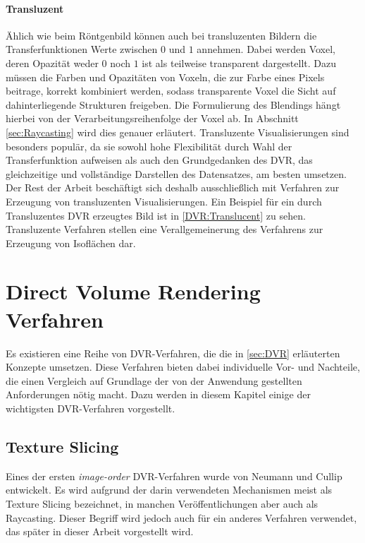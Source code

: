 \documentclass[a4paper,fontsize=12pt,toc=bib,parskip=half,ngerman]{scrartcl}
\begin{document}
\paragraph{Transluzent}
\"Ahlich wie beim R\"ontgenbild k\"onnen auch bei transluzenten Bildern die Transferfunktionen Werte zwischen $0$ und $1$ annehmen. Dabei werden Voxel, deren Opazit\"at weder $0$ noch $1$ ist als teilweise transparent dargestellt. Dazu m\"ussen die Farben und Opazit\"aten von Voxeln, die zur Farbe eines Pixels beitrage, korrekt kombiniert werden, sodass transparente Voxel die Sicht auf dahinterliegende Strukturen freigeben. Die Formulierung des Blendings h\"angt hierbei von der Verarbeitungsreihenfolge der Voxel ab. In Abschnitt \ref{sec:Raycasting} wird dies genauer erl\"autert. Transluzente Visualisierungen sind besonders popul\"ar, da sie sowohl hohe Flexibilit\"at durch Wahl der Transferfunktion aufweisen als auch den Grundgedanken des DVR, das gleichzeitige und vollst\"andige Darstellen des Datensatzes, am besten umsetzen. Der Rest der Arbeit besch\"aftigt sich deshalb ausschlie{\ss}lich mit Verfahren zur Erzeugung von transluzenten Visualisierungen. Ein Beispiel f\"ur ein durch Transluzentes DVR erzeugtes Bild ist in \cref{DVR:Translucent} zu sehen. Transluzente Verfahren stellen eine Verallgemeinerung des Verfahrens zur Erzeugung von Isofl\"achen dar.

\section{Direct Volume Rendering Verfahren}
Es existieren eine Reihe von DVR-Verfahren, die die in \cref{sec:DVR} erl\"auterten Konzepte umsetzen. Diese Verfahren bieten dabei individuelle Vor- und Nachteile, die einen Vergleich auf Grundlage der von der Anwendung gestellten Anforderungen n\"otig macht. Dazu werden in diesem Kapitel einige der wichtigsten DVR-Verfahren vorgestellt.

\subsection{Texture Slicing}
\label{sec:TextureSlicing}
Eines der ersten \textit{image-order} DVR-Verfahren wurde von Neumann und Cullip \cite{cullip1993accelerating} entwickelt. Es wird aufgrund der darin verwendeten Mechanismen meist als Texture Slicing bezeichnet, in manchen Ver\"offentlichungen aber auch als Raycasting. Dieser Begriff wird jedoch auch f\"ur ein anderes Verfahren verwendet, das sp\"ater in dieser Arbeit vorgestellt wird.
\end{document}
